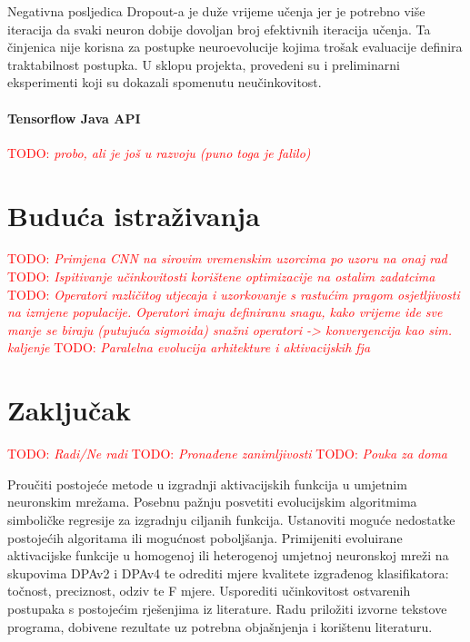 \documentclass[times, utf8, numeric, diplomski]{fer}
\def\TODO#1{\noindent\textcolor{red}{TODO: \textit{#1}}\newline}
\def\todo#1{\TODO{#1}}
\begin{document}
Negativna posljedica Dropout-a je duže vrijeme učenja jer je potrebno više iteracija da svaki neuron dobije dovoljan broj efektivnih iteracija učenja. Ta činjenica nije korisna za postupke neuroevolucije kojima trošak evaluacije definira traktabilnost postupka. U sklopu projekta, provedeni su i preliminarni eksperimenti koji su dokazali spomenutu neučinkovitost.

\subsubsection{Tensorflow Java API}
\todo{probo, ali je još u razvoju (puno toga je falilo)}

\chapter{Buduća istraživanja}
\todo{Primjena CNN na sirovim vremenskim uzorcima po uzoru na onaj rad}
\todo{Ispitivanje učinkovitosti korištene optimizacije na ostalim zadatcima}
\todo{Operatori različitog utjecaja i uzorkovanje s rastućim pragom osjetljivosti na izmjene populacije. Operatori imaju definiranu snagu, kako vrijeme ide sve manje se biraju (putujuća sigmoida) snažni operatori -> konvergencija kao sim. kaljenje}
\todo{Paralelna evolucija arhitekture i aktivacijskih fja \citep{cnn_evolution}}

\chapter{Zaključak}
\todo{Radi/Ne radi}
\todo{Pronađene zanimljivosti}
\todo{Pouka za doma}




\begin{sazetak}
Proučiti postojeće metode u izgradnji aktivacijskih funkcija u umjetnim neuronskim mrežama. Posebnu pažnju posvetiti evolucijskim algoritmima simboličke regresije za izgradnju ciljanih funkcija. Ustanoviti moguće nedostatke postojećih algoritama ili mogućnost poboljšanja. Primijeniti evoluirane aktivacijske funkcije u homogenoj ili heterogenoj umjetnoj neuronskoj mreži na skupovima DPAv2 i DPAv4 te odrediti mjere kvalitete izgrađenog klasifikatora: točnost, preciznost, odziv te F mjere. Usporediti učinkovitost ostvarenih postupaka s postojećim rješenjima iz literature. Radu priložiti izvorne tekstove programa, dobivene rezultate uz potrebna objašnjenja i korištenu literaturu.

\end{sazetak}
\end{document}
